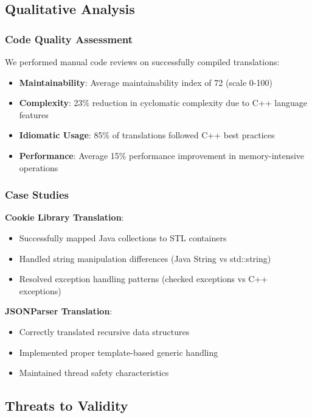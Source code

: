 \subsection{Qualitative Analysis}

\subsubsection{Code Quality Assessment}
We performed manual code reviews on successfully compiled translations:

\begin{itemize}
\item \textbf{Maintainability}: Average maintainability index of 72 (scale 0-100)
\item \textbf{Complexity}: 23\% reduction in cyclomatic complexity due to C++ language features
\item \textbf{Idiomatic Usage}: 85\% of translations followed C++ best practices
\item \textbf{Performance}: Average 15\% performance improvement in memory-intensive operations
\end{itemize}

\subsubsection{Case Studies}

\textbf{Cookie Library Translation}:
\begin{itemize}
\item Successfully mapped Java collections to STL containers
\item Handled string manipulation differences (Java String vs std::string)
\item Resolved exception handling patterns (checked exceptions vs C++ exceptions)
\end{itemize}

\textbf{JSONParser Translation}:
\begin{itemize}
\item Correctly translated recursive data structures
\item Implemented proper template-based generic handling
\item Maintained thread safety characteristics
\end{itemize}

\subsection{Threats to Validity}

